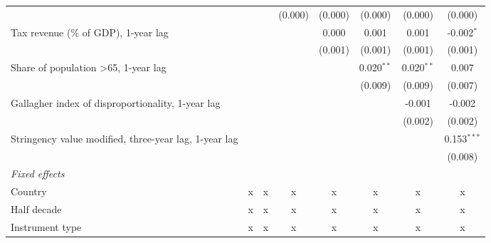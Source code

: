 \begin{tabular}{lccccccc}
                                                                       &                &               & (0.000)      & (0.000)      & (0.000)       & (0.000)       & (0.000)\\   
   Tax revenue (\% of GDP), 1-year lag                                 &                &               &              & 0.000        & 0.001         & 0.001         & -0.002$^{*}$\\   
                                                                       &                &               &              & (0.001)      & (0.001)       & (0.001)       & (0.001)\\   
   Share of population >65, 1-year lag                                 &                &               &              &              & 0.020$^{**}$  & 0.020$^{**}$  & 0.007\\   
                                                                       &                &               &              &              & (0.009)       & (0.009)       & (0.007)\\   
   Gallagher index of disproportionality, 1-year lag                   &                &               &              &              &               & -0.001        & -0.002\\   
                                                                       &                &               &              &              &               & (0.002)       & (0.002)\\   
   Stringency value modified, three-year lag, 1-year lag               &                &               &              &              &               &               & 0.153$^{***}$\\   
                                                                       &                &               &              &              &               &               & (0.008)\\   
   \emph{Fixed effects}\\
   Country                                                             & x              & x             & x            & x            & x             & x             & x\\  
   Half decade                                                         & x              & x             & x            & x            & x             & x             & x\\  
   Instrument type                                                     & x              & x             & x            & x            & x             & x             & x\\  

\end{tabular}
